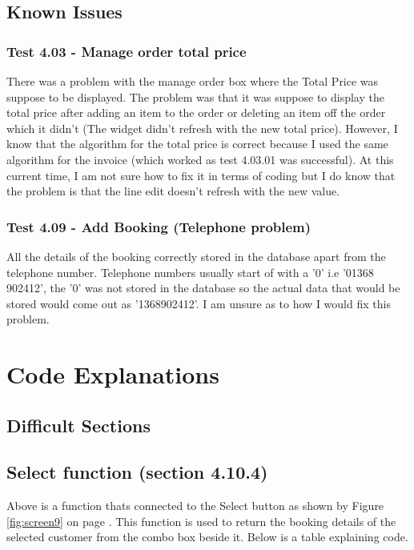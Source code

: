 \subsection{Known Issues}

\subsubsection{Test 4.03 - Manage order total price}
There was a problem with the manage order box where the Total Price was suppose to be displayed. The problem was that it was suppose to display the total price after adding an item to the order or deleting an item off the order which it didn't (The widget didn't refresh with the new total price). However, I know that the algorithm for the total price is correct because I used the same algorithm for the invoice (which worked as test 4.03.01 was successful). At this current time, I am not sure how to fix it in terms of coding but I do know that the problem is that the line edit doesn't refresh with the new value.

\subsubsection{Test 4.09 - Add Booking (Telephone problem)}

All the details of the booking correctly stored in the database apart from the telephone number. Telephone numbers usually start of with a '0' i.e '01368 902412', the '0' was not stored in the database so the actual data that would be stored would come out as '1368902412'. I am unsure as to how I would fix this problem.


\section{Code Explanations}

\subsection{Difficult Sections}

\newpage
\subsection{Select function (section 4.10.4)}

Above is a function thats connected to the Select button as shown by Figure \ref{fig:screen9} on page \pageref{fig:screen9}. This function is used to return the booking details of the selected customer from the combo box beside it. Below is a table explaining code.


